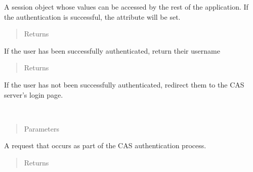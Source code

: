 \documentclass[letterpaper,10pt,english]{sphinxmanual}
\begin{document}
\begin{fulllineitems}
\begin{fulllineitems}
\begin{quote}
\begin{description}
\end{description}\end{quote}

A session object whose values can be accessed by the rest of the 
application. If the authentication is successful, the  
attribute will be set.
\begin{quote}\begin{description}
\item[{Returns}] \leavevmode
{}

\end{description}\end{quote}

If the user has been successfully authenticated, return their username
\begin{quote}\begin{description}
\item[{Returns}] \leavevmode
{}

\end{description}\end{quote}

If the user has not been successfully authenticated, redirect them to 
the CAS server’s login page.

\end{fulllineitems}


\begin{fulllineitems}
\label{\detokenize{tiger_leagues/readme:tiger_leagues.cas_client.CASClient.strip_ticket}}~\begin{quote}\begin{description}
\item[{Parameters}] \leavevmode
{} \textendash{} 

\end{description}\end{quote}

A request that occurs as part of the CAS authentication process.
\begin{quote}\begin{description}
\item[{Returns}] \leavevmode
{}


\end{description}
\end{quote}
\end{fulllineitems}
\end{fulllineitems}
\end{document}
